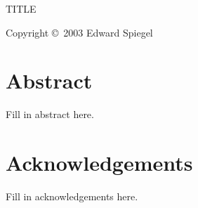 \documentclass[11 pt]{report}
\begin{document}
\baselineskip 21pt
\evensidemargin 0.25in
\footnotesep 14pt

\begin{titlepage}
\mbox{}
\vspace{1in}
\begin{center}
\LARGE TITLE \\
\end{center}
\vfill
\begin{center}
Copyright \copyright\ 2003 Edward Spiegel
\end{center}
\end{titlepage}

\evensidemargin 0in

\chapter*{Abstract}

Fill in abstract here.

\chapter*{Acknowledgements}

Fill in acknowledgements here.

\tableofcontents
\newpage



\setcounter{chapter}{-1}









\end{document}
